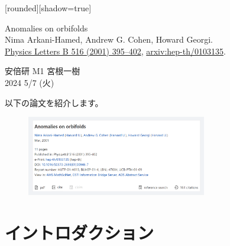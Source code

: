 \documentclass[
  unicode,a4paper,9pt,
  xcolor = {dvipsnames,svgnames},
  hyperref ={colorlinks=true,citecolor=Navy,linkcolor=NavyBlue,urlcolor=purple},
  ja=standard,lualatex
]{beamer}
\begin{document}
\nocite{Arkani-Hamed:2001uol}

\begin{frame}

  [rounded][shadow=true]
  \begin{block}{}
    \vspace*{5pt}

    \centering\Large
    Anomalies on orbifolds
    \\
    \normalsize
    Nima Arkani-Hamed, Andrew G. Cohen, Howard Georgi.
    \\
    \small
    \href{https://doi.org/10.1016/S0370-2693(01)00946-7}{Physics Letters B 516 (2001) 395–402},
    \href{https://doi.org/10.48550/arXiv.hep-th/0103135}{arxiv:hep-th/0103135}.

    \vspace*{5pt}
  \end{block}

  \begin{center}
    安倍研 M1 宮根一樹\\
    2024 5/7 (火)
  \end{center}

\end{frame}


\begin{frame}

  以下の論文を紹介します\cite{Arkani-Hamed:2001uol}。
  \begin{figure}[ht]
    \centering
    \includegraphics[width=0.7\textwidth]{fig/Arkani-Hamed2001uol.png}
  \end{figure}


\end{frame}


\section{イントロダクション}
\end{document}
